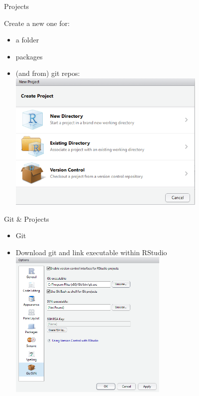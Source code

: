 \documentclass[ignorenonframetext,]{beamer}
\providecommand{\tightlist}{%
  \setlength{\itemsep}{0pt}\setlength{\parskip}{0pt}}
\begin{document}
\begin{frame}{Projects}
\protect\hypertarget{projects}{}

Create a new one for:

\begin{itemize}
\tightlist
\item
  a folder
\item
  packages
\item
  (and from) git repos:
  \includegraphics[width=0.75\textwidth,height=\textheight]{../external/images/setup_2_rstudio_project.PNG}
\end{itemize}

\end{frame}

\begin{frame}{Git \& Projects}
\protect\hypertarget{git-projects}{}

\begin{itemize}
\tightlist
\item
  Git
\item
  Download git and link executable within RStudio
  \includegraphics[width=0.6\textwidth,height=\textheight]{../external/images/setup_1_rstudio_git.PNG}
\end{itemize}

\end{frame}
\end{document}
